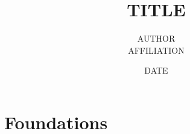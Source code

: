 \documentclass[openany]{book}
\title{{{TITLE}}}
\author{{{AUTHOR}} \\ {{AFFILIATION}}}
\date{{{DATE}}}
\begin{document}
\maketitle
\tableofcontents
\part{Foundations}



\appendix



\end{document}
